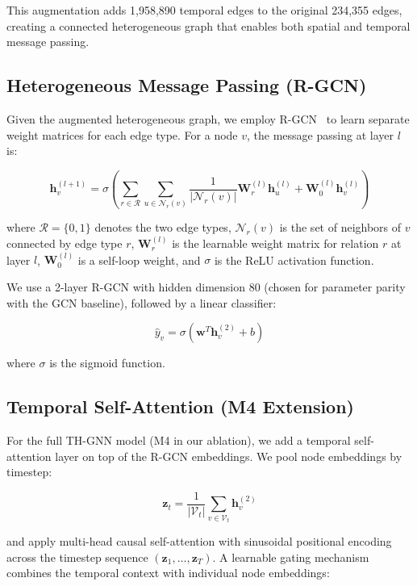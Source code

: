 This augmentation adds 1,958,890 temporal edges to the original 234,355 edges, creating a connected heterogeneous graph that enables both spatial and temporal message passing.

\subsection{Heterogeneous Message Passing (R-GCN)}

Given the augmented heterogeneous graph, we employ R-GCN~\cite{schlichtkrull2018modeling} to learn separate weight matrices for each edge type. For a node $v$, the message passing at layer $l$ is:

\begin{equation}
    \mathbf{h}_v^{(l+1)} = \sigma \left( \sum_{r \in \mathcal{R}} \sum_{u \in \mathcal{N}_r(v)} \frac{1}{|\mathcal{N}_r(v)|} \mathbf{W}_r^{(l)} \mathbf{h}_u^{(l)} + \mathbf{W}_0^{(l)} \mathbf{h}_v^{(l)} \right)
\end{equation}

where $\mathcal{R} = \{0, 1\}$ denotes the two edge types, $\mathcal{N}_r(v)$ is the set of neighbors of $v$ connected by edge type $r$, $\mathbf{W}_r^{(l)}$ is the learnable weight matrix for relation $r$ at layer $l$, $\mathbf{W}_0^{(l)}$ is a self-loop weight, and $\sigma$ is the ReLU activation function.

We use a 2-layer R-GCN with hidden dimension 80 (chosen for parameter parity with the GCN baseline), followed by a linear classifier:

\begin{equation}
    \hat{y}_v = \sigma(\mathbf{w}^T \mathbf{h}_v^{(2)} + b)
\end{equation}

where $\sigma$ is the sigmoid function.

\subsection{Temporal Self-Attention (M4 Extension)}

For the full TH-GNN model (M4 in our ablation), we add a temporal self-attention layer on top of the R-GCN embeddings. We pool node embeddings by timestep:

\begin{equation}
    \mathbf{z}_t = \frac{1}{|\mathcal{V}_t|} \sum_{v \in \mathcal{V}_t} \mathbf{h}_v^{(2)}
\end{equation}

and apply multi-head causal self-attention with sinusoidal positional encoding across the timestep sequence $(\mathbf{z}_1, \ldots, \mathbf{z}_T)$. A learnable gating mechanism combines the temporal context with individual node embeddings:

